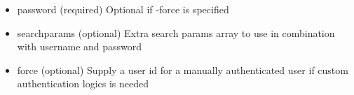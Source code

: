 \documentclass[letterpaper,10pt,english]{sphinxmanual}
\begin{document}
\begin{fulllineitems}
\begin{fulllineitems}
\begin{description}
\begin{itemize}
\item {} 
password (required)
Optional if -force is specified

\item {} 
searchparams (optional)
Extra search params array to use in combination with username and password

\item {} 
force (optional)
Supply a user id for a manually authenticated user if custom authentication logics is needed

\end{itemize}

\end{description}

\end{fulllineitems}


\begin{fulllineitems}
\label{knop_user:knop_user.loginattempt_count}
\end{fulllineitems}



\begin{fulllineitems}
\end{fulllineitems}


\begin{fulllineitems}
\label{knop_user:knop_user.loginattempt_date}
\end{fulllineitems}



\begin{fulllineitems}
\end{fulllineitems}


\begin{fulllineitems}
\label{knop_user:knop_user.logobjectfield}
\end{fulllineitems}



\begin{fulllineitems}
\end{fulllineitems}


\end{fulllineitems}
\end{document}
